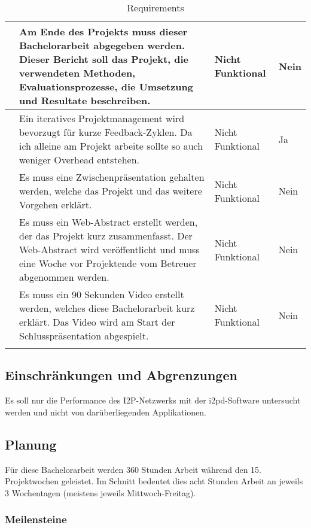 \begin{longtable}{N p{8.5cm} l l}
      & Am Ende des Projekts muss dieser Bachelorarbeit abgegeben werden. Dieser Bericht soll das Projekt, die verwendeten Methoden, Evaluationsprozesse, die Umsetzung und Resultate beschreiben.
                & Nicht Funktional & Nein \\ \midrule
      & Ein iteratives Projektmanagement wird bevorzugt für kurze Feedback-Zyklen. Da ich alleine am Projekt arbeite sollte so auch weniger Overhead entstehen. & Nicht Funktional & Ja \\ \midrule
      & Es muss eine Zwischenpräsentation gehalten werden, welche das Projekt und das weitere Vorgehen erklärt.
                & Nicht Funktional & Nein \\ \midrule
      & Es muss ein Web-Abstract erstellt werden, der das Projekt kurz zusammenfasst. Der Web-Abstract wird veröffentlicht und muss eine Woche vor Projektende vom Betreuer abgenommen werden.
                & Nicht Funktional & Nein \\ \midrule
      & Es muss ein 90 Sekunden Video erstellt werden, welches diese Bachelorarbeit kurz erklärt. Das Video wird am Start der Schlusspräsentation abgespielt.
                & Nicht Funktional & Nein \\ \midrule
    \bottomrule
    \caption{Requirements}\label{tab:requirements}
\end{longtable}

\subsection{Einschränkungen und Abgrenzungen}

Es soll nur die Performance des I2P-Netzwerks mit der i2pd-Software untersucht werden und nicht von darüberliegenden Applikationen.


\subsection{Planung}
\label{sec:Planung}

Für diese Bachelorarbeit werden 360 Stunden Arbeit während den 15. Projektwochen geleistet.
Im Schnitt bedeutet dies acht Stunden Arbeit an jeweils 3 Wochentagen (meistens jeweils Mittwoch-Freitag).


\subsubsection{Meilensteine}
\label{sec:meilensteine}

